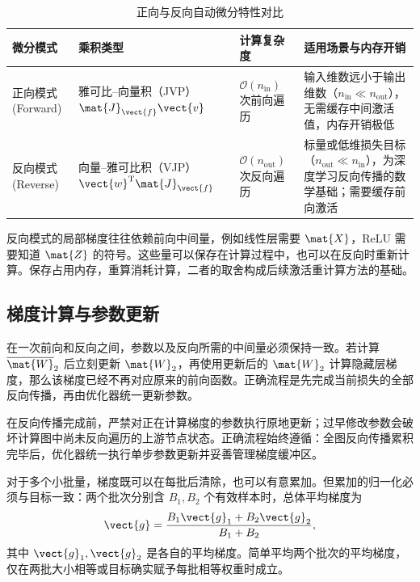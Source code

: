 \documentclass[../textbook.tex]{subfiles}
\begin{document}
\begin{table}[htbp]
\centering
\caption{正向与反向自动微分特性对比}\label{tab:autodiff-modes}
\begin{tabularx}{\linewidth}{p{22mm}p{30mm}p{28mm}X}
\toprule
微分模式 & 乘积类型 & 计算复杂度 & 适用场景与内存开销 \\\midrule
正向模式 (Forward) & 雅可比--向量积（JVP） $\mat{J}_{\vect{f}}\vect{v}$ & $\mathcal{O}(n_{\text{in}})$ 次前向遍历 & 输入维数远小于输出维数（$n_{\text{in}} \ll n_{\text{out}}$），无需缓存中间激活值，内存开销极低 \\
反向模式 (Reverse) & 向量--雅可比积（VJP） $\vect{w}^{\mathrm{T}}\mat{J}_{\vect{f}}$ & $\mathcal{O}(n_{\text{out}})$ 次反向遍历 & 标量或低维损失目标（$n_{\text{out}} \ll n_{\text{in}}$），为深度学习反向传播的数学基础；需要缓存前向激活 \\
\bottomrule
\end{tabularx}
\end{table}

反向模式的局部梯度往往依赖前向中间量，例如线性层需要 $\mat{X}$，ReLU 需要知道 $\mat{Z}$ 的符号。这些量可以保存在计算过程中，也可以在反向时重新计算。保存占用内存，重算消耗计算，二者的取舍构成后续激活重计算方法的基础。

\subsection{梯度计算与参数更新}
在一次前向和反向之间，参数以及反向所需的中间量必须保持一致。若计算 $\overline{\mat{W}}_2$ 后立刻更新 $\mat{W}_2$，再使用更新后的 $\mat{W}_2$ 计算隐藏层梯度，那么该梯度已经不再对应原来的前向函数。正确流程是先完成当前损失的全部反向传播，再由优化器统一更新参数。

\begin{warning}[梯度计算与参数更新的时序隔离]
在反向传播完成前，严禁对正在计算梯度的参数执行原地更新；过早修改参数会破坏计算图中尚未反向遍历的上游节点状态。正确流程始终遵循：全图反向传播累积完毕后，优化器统一执行单步参数更新并妥善管理梯度缓冲区。
\end{warning}

对于多个小批量，梯度既可以在每批后清除，也可以有意累加。但累加的归一化必须与目标一致：两个批次分别含 $B_1,B_2$ 个有效样本时，总体平均梯度为
\begin{equation}
 \vect{g}=\frac{B_1\vect{g}_1+B_2\vect{g}_2}{B_1+B_2},
\end{equation}
其中 $\vect{g}_1,\vect{g}_2$ 是各自的平均梯度。简单平均两个批次的平均梯度，仅在两批大小相等或目标确实赋予每批相等权重时成立。
\end{document}
